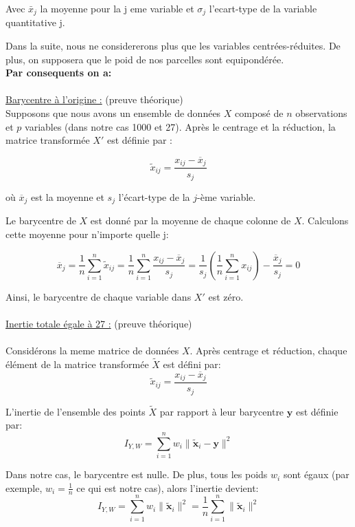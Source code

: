 \documentclass{article}
\begin{document}
Avec $\bar{x}_j$ la moyenne pour la j eme variable et  $\sigma_j$ l'ecart-type de la variable quantitative j.

\vspace{2\baselineskip}

Dans la suite, nous ne considererons plus que les variables centrées-réduites.
De plus, on supposera que le poid de nos parcelles sont equipondérée.
\vspace{2\baselineskip}
\\
\textbf{Par consequents on a:}
\\
\\
\underline{Barycentre à l'origine :} (preuve théorique)
\\

Supposons que nous avons un ensemble de données $X$ composé de $n$ observations et $p$ variables (dans notre cas 1000 et 27). Après le centrage et la réduction, la matrice transformée $X'$ est définie par :

\[
\tilde{x}_{ij} = \frac{x_{ij} - \overline{x}_j}{s_j}
\]

où $\overline{x}_j$ est la moyenne et $s_j$ l'écart-type de la $j$-ème variable.


Le barycentre de $X$ est donné par la moyenne de chaque colonne de $X$. Calculons cette moyenne pour n'importe quelle j:

\[
\overline{x}_j = \frac{1}{n} \sum_{i=1}^n \tilde{x}_{ij} = \frac{1}{n} \sum_{i=1}^n \frac{x_{ij} - \overline{x}_j}{s_j} = \frac{1}{s_j} \left(\frac{1}{n} \sum_{i=1}^n x_{ij}\right) - \frac{\overline{x}_j}{s_j} = 0
\]

Ainsi, le barycentre de chaque variable dans $X'$ est zéro.
\\
\\

\underline{Inertie totale égale à 27 :} (preuve théorique)
\\
\\
Considérons la meme matrice de données $X$. Après centrage et réduction, chaque élément de la matrice transformée $\tilde{X}$ est défini par:
\[
\tilde{x}_{ij} = \frac{x_{ij} - \overline{x}_j}{s_j}
\]



L'inertie de l'ensemble des points $\tilde{X}$ par rapport à leur barycentre $\mathbf{y}$ est définie par:
\[
I_{Y, W} = \sum_{i=1}^n w_i \|\mathbf{\tilde{x}}_i - \mathbf{y}\|^2
\]

Dans notre cas, le barycentre est nulle.
De plus, tous les poids $w_i$ sont égaux (par exemple, $w_i = \frac{1}{n}$ ce qui est notre cas), alors l'inertie devient:
\[
I_{Y, W} = \sum_{i=1}^n w_i \|\mathbf{\tilde{x}}_i\|^2 = \frac{1}{n} \sum_{i=1}^n \|\mathbf{\tilde{x}}_i\|^2 
\]
\end{document}
